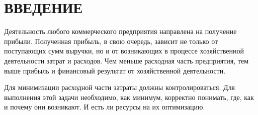 \chapter*{ВВЕДЕНИЕ}

Деятельность любого коммерческого предприятия направлена на получение прибыли. 
Полученная прибыль, в свою очередь, зависит не только от поступающих сумм выручки, но и от возникающих в процессе хозяйственной деятельности затрат и расходов. 
Чем меньше расходная часть предприятия, тем выше прибыль и финансовый результат от хозяйственной деятельности.

Для минимизации расходной части затраты должны контролироваться. Для выполнения этой задачи необходимо, как минимум, корректно понимать, где, как и почему они возникают. 
И есть ли ресурсы на их оптимизацию.